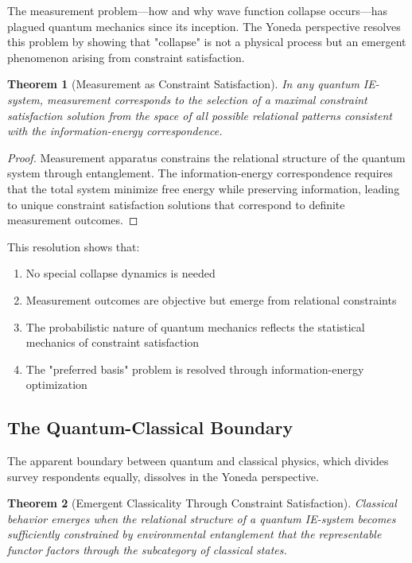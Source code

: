 \documentclass[12pt,a4paper]{article}
\newtheorem{theorem}{Theorem}[section]
\begin{document}
The measurement problem—how and why wave function collapse occurs—has plagued quantum mechanics since its inception. The Yoneda perspective resolves this problem by showing that "collapse" is not a physical process but an emergent phenomenon arising from constraint satisfaction.

\begin{theorem}[Measurement as Constraint Satisfaction]
In any quantum IE-system, measurement corresponds to the selection of a maximal constraint satisfaction solution from the space of all possible relational patterns consistent with the information-energy correspondence.
\end{theorem}

\begin{proof}
Measurement apparatus constrains the relational structure of the quantum system through entanglement. The information-energy correspondence requires that the total system minimize free energy while preserving information, leading to unique constraint satisfaction solutions that correspond to definite measurement outcomes.
\end{proof}

This resolution shows that:
\begin{enumerate}
\item No special collapse dynamics is needed
\item Measurement outcomes are objective but emerge from relational constraints
\item The probabilistic nature of quantum mechanics reflects the statistical mechanics of constraint satisfaction
\item The "preferred basis" problem is resolved through information-energy optimization
\end{enumerate}

\subsection{The Quantum-Classical Boundary}

The apparent boundary between quantum and classical physics, which divides survey respondents equally, dissolves in the Yoneda perspective.

\begin{theorem}[Emergent Classicality Through Constraint Satisfaction]
Classical behavior emerges when the relational structure of a quantum IE-system becomes sufficiently constrained by environmental entanglement that the representable functor factors through the subcategory of classical states.
\end{theorem}
\end{document}
